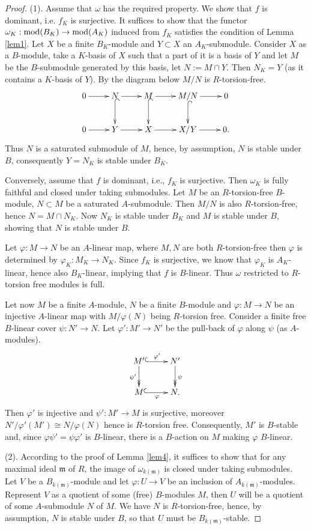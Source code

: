\documentclass[12pt]{amsart}
\theoremstyle{plain}
\theoremstyle{definition}
\numberwithin{thm}{section}
\def\mod{{\rm mod}}
\begin{document}
\begin{proof}

(1). Assume that $\omega$ has the required 
property. We show that $f$ is dominant, i.e. 
$f_K$ is surjective. It suffices to show that the 
functor $\omega_K:\mod(B_K)\to \mod(A_K)$ 
induced from $f_K$ satisfies the condition of 
Lemma \ref{lem1}. Let $X$ be a finite $B_K$-module and $Y\subset X$ an $A_K$-submodule. 
Consider $X$ as a $B$-module, take a $K$-basis of $X$ such that a part of it is a basis of $Y$ and let $M$ be the $B$-submodule generated by this basis, let $N:=M\cap Y$. Then $N_K=Y$ (as it contains a $K$-basis of $Y$). By the diagram 
below $M/N$ is $R$-torsion-free.
$$\xymatrix{0\ar[r]&N\ar[r]\ar@{^(->}[d]& 
M\ar[r]\ar@{^(->}[d]& M/N\ar[r]\ar@{^(->}
[d]&0\\
0\ar[r]& Y\ar[r]& X\ar[r]&X/Y\ar[r]&0.}$$
Thus $N$ is a saturated submodule of $M$, hence, by assumption, $N$ is stable under $B$, consequently
$Y=N_K$ is stable under $B_K$.

Conversely, assume that $f$ is dominant, i.e., $f_K$ is surjective. Then 
$\omega_K$ is fully faithful and closed under 
taking submodules. Let $M$ be an $R$-torsion-free 
$B$-module, $N\subset M$ be a saturated 
$A$-submodule. Then $M/N$ is also 
$R$-torsion-free, hence $N=M\cap N_K$. Now 
$N_K$ is stable under $B_K$ and $M$ is 
stable under $B$, showing that $N$ is stable 
under $B$.

 Let 
$\varphi:M\to N$ be an $A$-linear map, where 
$M,N$ are 
both $R$-torsion-free then $\varphi$ is 
determined by $\varphi_K:M_K\to N_K$. Since 
$f_K$ is surjective, we know that $\varphi_K$ is 
$A_K$-linear, hence also $B_K$-linear, implying that $f$ is $B$-linear. Thus $\omega$ restricted to $R$-torsion free modules is full.



Let now $M$ be a finite $A$-module, $N$ be a finite $B$-module and $\varphi:M\to N$ be an injective $A$-linear map with $M/\varphi(N)$ being $R$-torsion free. Consider a finite free 
$B$-linear cover $\psi:N'\to N$. Let 
$\varphi':M'\to N'$ be the pull-back of 
$\varphi$ along $\psi$ (as $A$-modules). 
$$\xymatrix{M'\ar@{->>}[d]_{\psi'}\ar@{^(->}[r]^{\varphi'}&N'\ar@{->>}[d]^\psi\\ M\ar@{^(->}[r]_\varphi &N.}$$
Then $\varphi'$ is 
injective and $\psi':M'\to M$ is surjective, moreover $N'/\varphi'(M')\cong N/\varphi(N)$ hence is $R$-torsion free.
Consequently, $M'$ is $B$-stable and, since $\varphi\psi'=\psi\varphi'$ is $B$-linear, there is a $B$-action on $M$ making $\varphi$ $B$-linear.
 

(2). According to the proof of Lemma \ref{lem4}, 
it suffices to show that for any maximal ideal 
$\mathfrak m$ of $R$, the image of 
$\omega_{k(\mathfrak m)}$ is closed under 
taking submodules. Let $V$ be a 
$B_{k(\mathfrak m)}$-module and let 
$\varphi:U\to V$ be an inclusion of 
$A_{k(\mathfrak m)}$-modules. Represent $V$ 
as a quotient of some (free) $B$-modules $M$, 
then $U$ will be a quotient of some $A$-submodule $N$ of $M$. We have $N$ is $R$-torsion-free, hence, by 
assumption, $N$ is stable under $B$,  so that
$U$ must be $B_{k(\mathfrak m)}$-stable.
\end{proof}
\end{document}
